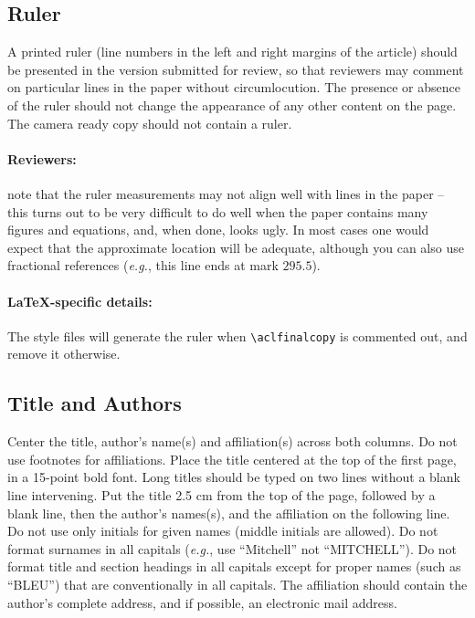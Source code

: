 \documentclass[11pt,a4paper]{article}
\begin{document}
\subsection{Ruler}
A printed ruler (line numbers in the left and right margins of the article) should be presented in the version submitted for review, so that reviewers may comment on particular lines in the paper without circumlocution.
The presence or absence of the ruler should not change the appearance of any other content on the page.
The camera ready copy should not contain a ruler.

\paragraph{Reviewers:}
note that the ruler measurements may not align well with lines in the paper -- this turns out to be very difficult to do well when the paper contains many figures and equations, and, when done, looks ugly.
In most cases one would expect that the approximate location will be adequate, although you can also use fractional references (\emph{e.g.}, this line ends at mark $295.5$).

\paragraph{\LaTeX-specific details:}
The style files will generate the ruler when {\small\verb|\aclfinalcopy|} is commented out, and remove it otherwise.

\subsection{Title and Authors}
\label{ssec:title-authors}

Center the title, author's name(s) and affiliation(s) across both columns.
Do not use footnotes for affiliations.
Place the title centered at the top of the first page, in a 15-point bold font.
Long titles should be typed on two lines without a blank line intervening.
Put the title 2.5 cm from the top of the page, followed by a blank line, then the author's names(s), and the affiliation on the following line.
Do not use only initials for given names (middle initials are allowed).
Do not format surnames in all capitals (\emph{e.g.}, use ``Mitchell'' not ``MITCHELL'').
Do not format title and section headings in all capitals except for proper names (such as ``BLEU'') that are
conventionally in all capitals.
The affiliation should contain the author's complete address, and if possible, an electronic mail address.
\end{document}
